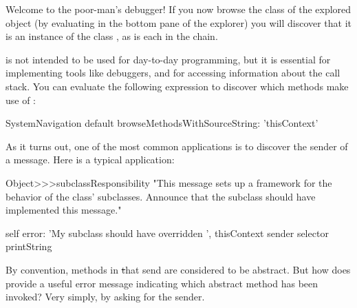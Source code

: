 \documentclass[a4paper,10pt,twoside]{book}
\begin{document}
Welcome to the poor-man's debugger!
If you now browse the class of the explored object (\ie by evaluating  in the bottom pane of the explorer) you will discover that it is an instance of the class , as is each  in the chain.

 is not intended to be used for day-to-day programming, but it is essential for implementing tools like debuggers, and for accessing information about the call stack.
You can evaluate the following expression to discover which methods make use of :

\begin{code}{}
SystemNavigation default browseMethodsWithSourceString: 'thisContext'
\end{code}

As it turns out, one of the most common applications is to discover the sender of a message.
Here is a typical application:
\begin{code}{}
Object>>>subclassResponsibility
	"This message sets up a framework for the behavior of the class' subclasses.
	Announce that the subclass should have implemented this message."

	self error: 'My subclass should have overridden ', thisContext sender selector printString
\end{code}

By convention, methods in \st that send  are considered to be abstract.  But how does  provide a useful error message indicating which abstract method has been invoked?  Very simply, by asking  for the sender.

\end{document}
